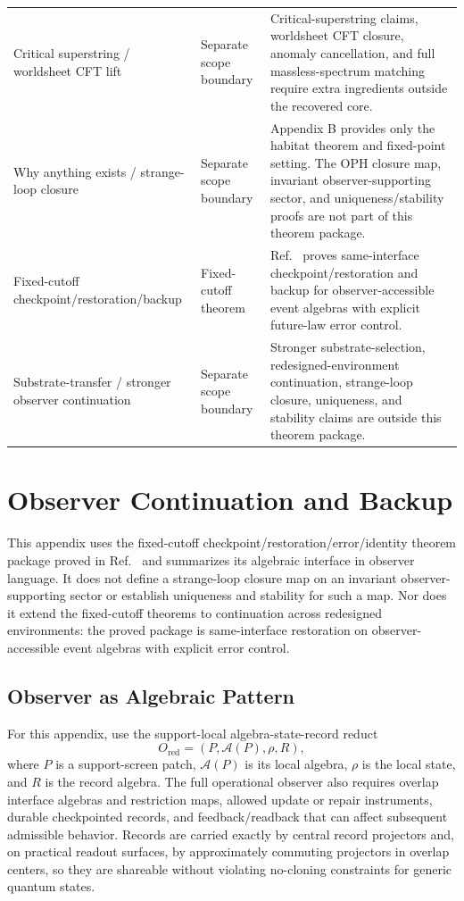 \begin{longtable}{@{}>{\raggedright\arraybackslash}p{}>{\raggedright\arraybackslash}p{}>{\raggedright\arraybackslash}p{}@{}}
Critical superstring / worldsheet CFT lift & Separate scope boundary & Critical-superstring claims, worldsheet CFT closure, anomaly cancellation, and full massless-spectrum matching require extra ingredients outside the recovered core. \\
Why anything exists / strange-loop closure & Separate scope boundary & Appendix B provides only the habitat theorem and fixed-point setting. The OPH closure map, invariant observer-supporting sector, and uniqueness/stability proofs are not part of this theorem package. \\
Fixed-cutoff checkpoint/restoration/backup & Fixed-cutoff theorem & Ref.~\cite{ophmicrophysics} proves same-interface checkpoint/restoration and backup for observer-accessible event algebras with explicit future-law error control. \\
Substrate-transfer / stronger observer continuation & Separate scope boundary & Stronger substrate-selection, redesigned-environment continuation, strange-loop closure, uniqueness, and stability claims are outside this theorem package. \\
\bottomrule
\end{longtable}
\endgroup

\section{Observer Continuation and Backup}

This appendix uses the fixed-cutoff checkpoint/restoration/error/identity theorem package proved
in Ref.~\cite{ophmicrophysics} and summarizes its algebraic interface in observer language. It
does not define a strange-loop closure map on an invariant observer-supporting sector or establish
uniqueness and stability for such a map. Nor does it extend the fixed-cutoff theorems to
continuation across redesigned environments: the proved package is same-interface restoration on
observer-accessible event algebras with explicit error control.

\subsection{Observer as Algebraic Pattern}

For this appendix, use the support-local algebra-state-record reduct
\[
O_{\mathrm{red}}=(P,\mathcal{A}(P),\rho,R),
\]
where \(P\) is a support-screen patch, \(\mathcal{A}(P)\) is its local algebra, \(\rho\) is the local
state, and \(R\) is the record algebra. The full operational observer also requires overlap
interface algebras and restriction maps, allowed update or repair instruments, durable checkpointed
records, and feedback/readback that can affect subsequent admissible behavior. Records are carried exactly by central record projectors
and, on practical readout surfaces, by approximately commuting projectors in overlap centers, so
they are shareable without violating no-cloning constraints for generic quantum states.

